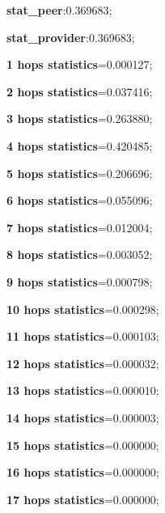 \documentclass[a4paper]{article}
\begin{document}
\textbf{stat\_peer}:0.369683;

\textbf{stat\_provider}:0.369683;

\textbf{1 hops statistics}=0.000127;

\textbf{2 hops statistics}=0.037416;

\textbf{3 hops statistics}=0.263880;

\textbf{4 hops statistics}=0.420485;

\textbf{5 hops statistics}=0.206696;

\textbf{6 hops statistics}=0.055096;

\textbf{7 hops statistics}=0.012004;

\textbf{8 hops statistics}=0.003052;

\textbf{9 hops statistics}=0.000798;

\textbf{10 hops statistics}=0.000298;

\textbf{11 hops statistics}=0.000103;

\textbf{12 hops statistics}=0.000032;

\textbf{13 hops statistics}=0.000010;

\textbf{14 hops statistics}=0.000003;

\textbf{15 hops statistics}=0.000000;

\textbf{16 hops statistics}=0.000000;

\textbf{17 hops statistics}=0.000000;
\end{document}
